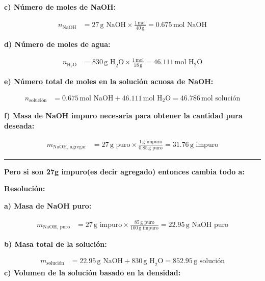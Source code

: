 \documentclass{article}
\begin{document}
\begin{multicols}{2}
\textbf{c) Número de moles de NaOH:}

\begin{align*}
    n_{\text{NaOH}} &= 27 \, \text{g NaOH} \times \frac{1 \, \text{mol}}{40 \, \text{g}} = 0.675 \, \text{mol NaOH}
\end{align*}

\textbf{d) Número de moles de agua:}

\begin{align*}
    n_{\text{H}_2\text{O}} &= 830 \, \text{g H}_2\text{O} \times \frac{1 \, \text{mol}}{18 \, \text{g}} = 46.111 \, \text{mol H}_2\text{O}
\end{align*}

\textbf{e) Número total de moles en la solución acuosa de NaOH:}

\begin{align*}
    n_{\text{solución}} &= 0.675 \, \text{mol NaOH} + 46.111 \, \text{mol H}_2\text{O} = 46.786 \, \text{mol solución}
\end{align*}

\textbf{f) Masa de NaOH impuro necesaria para obtener la cantidad pura deseada:}

\begin{align*}
    m_{\text{NaOH, agregar}} &= 27 \, \text{g puro} \times \frac{1 \, \text{g impuro}}{0.85 \, \text{g puro}} = 31.76 \, \text{g impuro}
\end{align*}

\end{multicols} %
\noindent\rule{\textwidth}{0.5pt}
\textbf{Pero si son 27g impuro(es decir agregado) entonces cambia todo a:}

\noindent\textbf{Resolución:} %

\textbf{a) Masa de NaOH puro:}

\begin{align*}
    m_{\text{NaOH, puro}} &= 27 \, \text{g impuro} \times \frac{85 \, \text{g puro}}{100 \, \text{g impuro}} = 22.95 \, \text{g NaOH puro}
\end{align*}

\textbf{b) Masa total de la solución:}

\begin{align*}
    m_{\text{solución}} &= 22.95 \, \text{g NaOH} + 830 \, \text{g H}_2\text{O} = 852.95 \, \text{g solución}
\end{align*}
\newpage
\textbf{c) Volumen de la solución basado en la densidad:}
\end{document}
